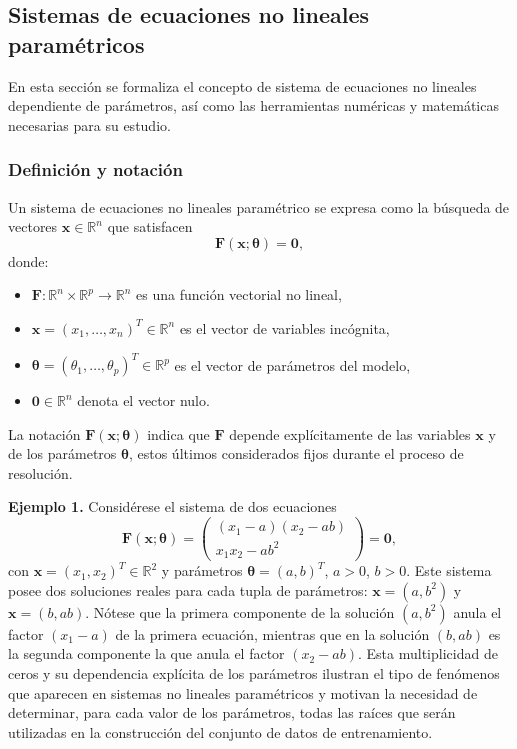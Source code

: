 \documentclass[12pt,a4paper]{article} \usepackage[utf8]{inputenc} \usepackage[spanish]{babel} \usepackage{amsmath, amssymb, amsthm} \usepackage{bm} \usepackage{float} \usepackage{longtable} \usepackage[hidelinks]{hyperref}
\newcommand{\xvec}{\mathbf{x}} \newcommand{\thetavec}{\boldsymbol{\theta}} \newcommand{\Fvec}{\mathbf{F}} \newcommand{\R}{\mathbb{R}} \newcommand{\norm}[1]{\left\lVert#1\right\rVert} \newcommand{\loss}{\mathcal{L}} \newcommand{\dataset}{\mathcal{D}} \newcommand{\jac}{\mathbf{J}}
\begin{document}
\subsection{Sistemas de ecuaciones no lineales paramétricos}
\label{sec:sistemas}

En esta sección se formaliza el concepto de sistema de ecuaciones no lineales dependiente de parámetros, así como las herramientas numéricas y matemáticas necesarias para su estudio.

\subsubsection{Definición y notación}

Un sistema de ecuaciones no lineales paramétrico se expresa como la búsqueda de vectores \(\xvec \in \R^n\) que satisfacen
\begin{equation}
\Fvec(\xvec; \thetavec) = \mathbf{0}, \label{eq:sistema_general}
\end{equation}
donde:
\begin{itemize}
 \item \(\Fvec: \R^n \times \R^p \to \R^n\) es una función vectorial no lineal, \item \(\xvec = (x_1, \dots, x_n)^T \in \R^n\) es el vector de variables incógnita, \item \(\thetavec = (\theta_1, \dots, \theta_p)^T \in \R^p\) es el vector de parámetros del modelo, \item \(\mathbf{0} \in \R^n\) denota el vector nulo.
\end{itemize}
La notación \(\Fvec(\xvec; \thetavec)\) indica que \(\Fvec\) depende explícitamente de las variables \(\xvec\) y de los parámetros \(\thetavec\), estos últimos considerados fijos durante el proceso de resolución.

\bigskip \noindent\textbf{Ejemplo 1.} Considérese el sistema de dos ecuaciones \[ \Fvec(\xvec; \thetavec) = 
\begin{pmatrix}
(x_1 - a)(x_2 - ab) \\[2pt] x_1 x_2 - a b^2
\end{pmatrix}
= \mathbf{0}, \] con \(\xvec = (x_1, x_2)^T \in \R^2\) y parámetros \(\thetavec = (a, b)^T\), \(a > 0\), \(b > 0\). Este sistema posee dos soluciones reales para cada tupla de parámetros: \(\xvec = (a, b^2)\) y \(\xvec = (b, ab)\). Nótese que la primera componente de la solución \((a, b^2)\) anula el factor \((x_1 - a)\) de la primera ecuación, mientras que en la solución \((b, ab)\) es la segunda componente la que anula el factor \((x_2 - ab)\). Esta multiplicidad de ceros y su dependencia explícita de los parámetros ilustran el tipo de fenómenos que aparecen en sistemas no lineales paramétricos y motivan la necesidad de determinar, para cada valor de los parámetros, todas las raíces que serán utilizadas en la construcción del conjunto de datos de entrenamiento.
\end{document}

